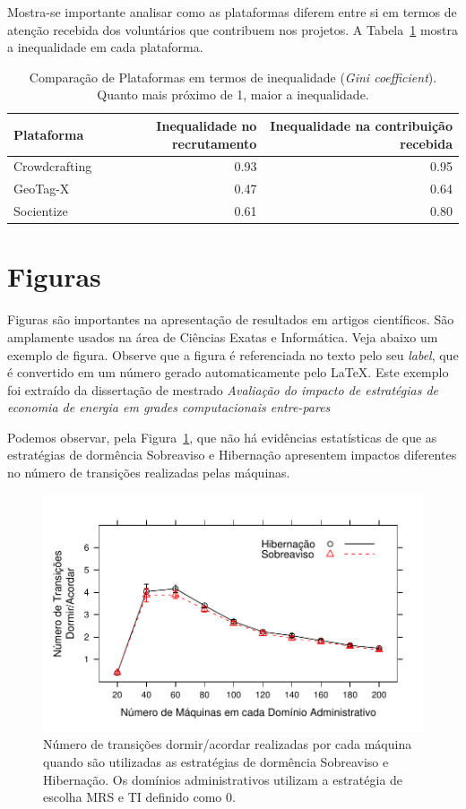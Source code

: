 \documentclass[12pt]{article}
\begin{document}
Mostra-se importante analisar como as plataformas diferem entre si em termos de atenção recebida dos voluntários que contribuem nos projetos. A Tabela~\ref{tab:ineq} mostra  a inequalidade em cada plataforma. 

\begin{table}[htb]
  \caption{Comparação de Plataformas em termos de inequalidade (\textit{Gini coefficient}). Quanto mais próximo de 1, maior a inequalidade.}
  \centering
  \label{tab:ineq}
  \begin{tabular}{l|r|r}
  \hline
    Plataforma&Inequalidade no recrutamento&Inequalidade na contribuição recebida\\
    \hline
    Crowdcrafting      &  0.93 & 0.95\\
    GeoTag-X       &  0.47 & 0.64\\
    Socientize    &  0.61    & 0.80\\
  \hline
\end{tabular}
\end{table}

\section{Figuras}

Figuras são importantes na apresentação de resultados em artigos científicos. São amplamente usados na área de Ciências Exatas e Informática. Veja abaixo um exemplo de figura. Observe que a figura é referenciada no texto pelo seu \textit{label}, que é convertido em um número gerado automaticamente pelo \LaTeX. Este exemplo foi extraído da dissertação de mestrado \textit{Avaliação do impacto de estratégias de economia de energia em grades computacionais entre-pares}~\cite{Ponciano:Thesis:2011}

Podemos observar, pela Figura~\ref{fig:TimesTransition}, que não há evidências estatísticas de que as estratégias de dormência Sobreaviso e Hibernação apresentem impactos diferentes no número de transições realizadas pelas máquinas.

\begin{figure}[htb]
 \centering
 \includegraphics[width=0.9\linewidth]{TimesTransition.pdf}
 \caption{Número de transições dormir/acordar realizadas por cada máquina quando são utilizadas as estratégias de dormência Sobreaviso e Hibernação. Os domínios administrativos utilizam a estratégia de escolha MRS e TI definido como $0$.}
 \label{fig:TimesTransition}
\end{figure}
\end{document}
